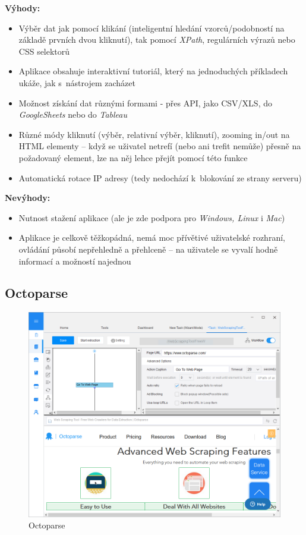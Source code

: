 \documentclass[thesis=B,czech]{FITthesis}[2012/06/26]
\begin{document}
\textbf{Výhody:}
\begin{itemize}
	\item Výběr dat jak pomocí klikání (inteligentní hledání vzorců/podobností na základě prvních dvou kliknutí), tak pomocí \emph{XPath}, regulárních výrazů nebo CSS selektorů
	\item Aplikace obsahuje interaktivní tutoriál, který na jednoduchých příkladech ukáže, jak s~nástrojem zacházet
	\item Možnost získání dat různými formami - přes API, jako CSV/XLS, do \emph{GoogleSheets} nebo do \emph{Tableau}
	\item Různé módy kliknutí (výběr, relativní výběr, kliknutí), zooming in/out na HTML elementy -- když se uživatel netrefí (nebo ani trefit nemůže) přesně na požadovaný element, lze na něj lehce přejít pomocí této funkce
	\item Automatická rotace IP adresy (tedy nedochází k~blokování ze strany serveru)
\end{itemize}

\textbf{Nevýhody:}
\begin{itemize}
	\item Nutnost stažení aplikace (ale je zde podpora pro \emph{Windows, Linux} i \emph{Mac})
	\item Aplikace je celkově těžkopádná, nemá moc přívětivé uživatelské rozhraní, ovládání působí nepřehledně a přehlceně -- na uživatele se vyvalí hodně informací a možností najednou
\end{itemize}


\subsection{Octoparse}
\begin{figure}[h]
	\includegraphics[width=\linewidth]{images/Octoparse.png}
	\caption{Octoparse}
	\label{fig:octoparse}
\end{figure}
\end{document}
